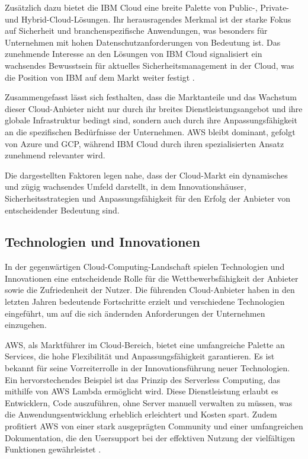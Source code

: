Zusätzlich dazu bietet die IBM Cloud eine breite Palette von Public-, Private- und Hybrid-Cloud-Lösungen. Ihr herausragendes Merkmal ist der starke Fokus auf Sicherheit und branchenspezifische Anwendungen, was besonders für Unternehmen mit hohen Datenschutzanforderungen von Bedeutung ist. Das zunehmende Interesse an den Lösungen von IBM Cloud signalisiert ein wachsendes Bewusstsein für aktuelles Sicherheitsmanagement in der Cloud, was die Position von IBM auf dem Markt weiter festigt \cite{[4]}.

Zusammengefasst lässt sich festhalten, dass die Marktanteile und das Wachstum dieser Cloud-Anbieter nicht nur durch ihr breites Dienstleistungsangebot und ihre globale Infrastruktur bedingt sind, sondern auch durch ihre Anpassungsfähigkeit an die spezifischen Bedürfnisse der Unternehmen. AWS bleibt dominant, gefolgt von Azure und GCP, während IBM Cloud durch ihren spezialisierten Ansatz zunehmend relevanter wird.

Die dargestellten Faktoren legen nahe, dass der Cloud-Markt ein dynamisches und zügig wachsendes Umfeld darstellt, in dem Innovationshäuser, Sicherheitsstrategien und Anpassungsfähigkeit für den Erfolg der Anbieter von entscheidender Bedeutung sind.

\subsection{Technologien und Innovationen}

In der gegenwärtigen Cloud-Computing-Landschaft spielen Technologien und Innovationen eine entscheidende Rolle für die Wettbewerbsfähigkeit der Anbieter sowie die Zufriedenheit der Nutzer. Die führenden Cloud-Anbieter haben in den letzten Jahren bedeutende Fortschritte erzielt und verschiedene Technologien eingeführt, um auf die sich ändernden Anforderungen der Unternehmen einzugehen.

AWS, als Marktführer im Cloud-Bereich, bietet eine umfangreiche Palette an Services, die hohe Flexibilität und Anpassungsfähigkeit garantieren. Es ist bekannt für seine Vorreiterrolle in der Innovationsführung neuer Technologien. Ein hervorstechendes Beispiel ist das Prinzip des Serverless Computing, das mithilfe von AWS Lambda ermöglicht wird. Diese Dienstleistung erlaubt es Entwicklern, Code auszuführen, ohne Server manuell verwalten zu müssen, was die Anwendungsentwicklung erheblich erleichtert und Kosten spart. Zudem profitiert AWS von einer stark ausgeprägten Community und einer umfangreichen Dokumentation, die den Usersupport bei der effektiven Nutzung der vielfältigen Funktionen gewährleistet \cite{[1]}.

